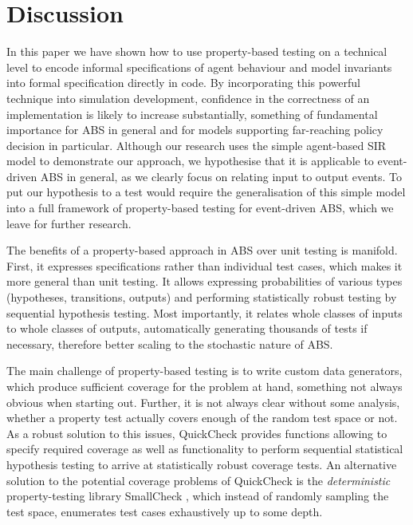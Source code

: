 \section{Discussion}
\label{sec:discussion}
In this paper we have shown how to use property-based testing on a technical level to encode informal specifications of agent behaviour and model invariants into formal specification directly in code. By incorporating this powerful technique into simulation development, confidence in the correctness of an implementation is likely to increase substantially, something of fundamental importance for ABS in general and for models supporting far-reaching policy decision in particular. Although our research uses the simple agent-based SIR model to demonstrate our approach, we hypothesise that it is applicable to event-driven ABS \cite{meyer_event-driven_2014} in general, as we clearly focus on relating input to output events. To put our hypothesis to a test would require the generalisation of this simple model into a full framework of property-based testing for event-driven ABS, which we leave for further research.

The benefits of a property-based approach in ABS over unit testing is manifold. First, it expresses specifications rather than individual test cases, which makes it more general than unit testing. It allows expressing probabilities of various types (hypotheses, transitions, outputs) and performing statistically robust testing by sequential hypothesis testing. Most importantly, it relates whole classes of inputs to whole classes of outputs, automatically generating thousands of tests if necessary, therefore better scaling to the stochastic nature of ABS. 

The main challenge of property-based testing is to write custom data generators, which produce sufficient coverage for the problem at hand, something not always obvious when starting out. Further, it is not always clear without some analysis, whether a property test actually covers enough of the random test space or not. As a robust solution to this issues, QuickCheck provides functions allowing to specify required coverage as well as functionality to perform sequential statistical hypothesis testing to arrive at statistically robust coverage tests. An alternative solution to the potential coverage problems of QuickCheck is the \textit{deterministic} property-testing library SmallCheck \cite{runciman_smallcheck_2008}, which instead of randomly sampling the test space, enumerates test cases exhaustively up to some depth.

